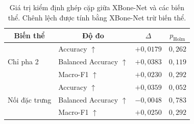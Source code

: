 \begin{table}[H]
\centering
\small
\renewcommand{\arraystretch}{1.15}
\begin{tabular}{llcc}
\toprule
\multicolumn{1}{c}{\textbf{Biến thể}} & \multicolumn{1}{c}{\textbf{Độ đo}} & \multicolumn{1}{c}{\textbf{$\Delta$}} & \multicolumn{1}{c}{\textbf{$p_{\mathrm{Holm}}$}} \\
\midrule
\multirow{3}{*}{Chỉ pha 2} & Accuracy $\uparrow$ & $+0{,}0179$ & $0{,}262$ \\
 & Balanced Accuracy $\uparrow$ & $+0{,}0383$ & $0{,}119$ \\
 & Macro-F1 $\uparrow$ & $+0{,}0230$ & $0{,}292$ \\
\midrule
\multirow{3}{*}{Nối đặc trưng} & Accuracy $\uparrow$ & $+0{,}0359$ & $0{,}052$ \\
 & Balanced Accuracy $\uparrow$ & $-0{,}0048$ & $0{,}783$ \\
 & Macro-F1 $\uparrow$ & $+0{,}0250$ & $0{,}292$ \\
\bottomrule
\end{tabular}%
\caption{Giá trị kiểm định ghép cặp giữa XBone-Net và các biến thể. Chênh lệch được tính bằng XBone-Net trừ biến thể.}
\label{tab:appendix-ablation-paired-statistics}
\end{table}
